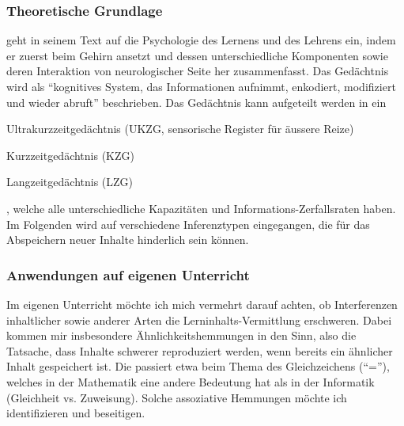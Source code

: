 \begin{myExBox}[title=Interferenzen]
\subsubsection*{Theoretische Grundlage}
\textcite{alma99116996690305511} geht in seinem Text auf die Psychologie des Lernens und des Lehrens ein, indem er zuerst beim Gehirn ansetzt und dessen unterschiedliche Komponenten sowie deren Interaktion von neurologischer Seite her zusammenfasst. Das Gedächtnis wird als ``kognitives System, das Informationen aufnimmt, enkodiert, modifiziert und wieder abruft'' beschrieben. Das Gedächtnis kann aufgeteilt werden in ein \begin{enumerate*}
\item Ultrakurzzeitgedächtnis (UKZG, sensorische Register für äussere Reize)
\item Kurzzeitgedächtnis (KZG)
\item Langzeitgedächtnis (LZG)
\end{enumerate*}, welche alle unterschiedliche Kapazitäten und Informations-Zerfallsraten haben. Im Folgenden wird auf verschiedene Inferenztypen eingegangen, die für das Abspeichern neuer Inhalte hinderlich sein können.
\subsubsection*{Anwendungen auf eigenen Unterricht}
Im eigenen Unterricht möchte ich mich vermehrt darauf achten, ob Interferenzen inhaltlicher sowie anderer Arten die Lerninhalts-Vermittlung erschweren. Dabei kommen mir insbesondere Ähnlichkeitshemmungen in den Sinn, also die Tatsache, dass Inhalte schwerer reproduziert werden, wenn bereits ein ähnlicher Inhalt gespeichert ist. Die passiert etwa beim Thema des Gleichzeichens (``=''), welches in der Mathematik eine andere Bedeutung hat als in der Informatik (Gleichheit vs. Zuweisung). Solche assoziative Hemmungen möchte ich identifizieren und beseitigen.
\end{myExBox}


